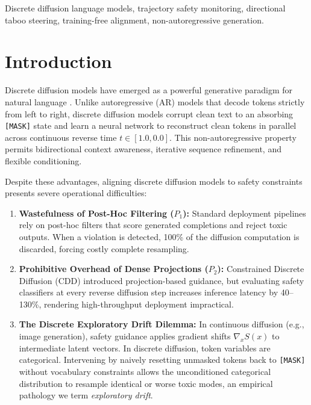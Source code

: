 \documentclass[conference]{IEEEtran}
\begin{document}
\begin{IEEEkeywords}
Discrete diffusion language models, trajectory safety monitoring, directional taboo steering, training-free alignment, non-autoregressive generation.
\end{IEEEkeywords}

\section{Introduction}
Discrete diffusion models have emerged as a powerful generative paradigm for natural language \cite{austin2021structured,sahoo2024simple}. Unlike autoregressive (AR) models that decode tokens strictly from left to right, discrete diffusion models corrupt clean text to an absorbing \texttt{[MASK]} state and learn a neural network to reconstruct clean tokens in parallel across continuous reverse time $t \in [1.0, 0.0]$. This non-autoregressive property permits bidirectional context awareness, iterative sequence refinement, and flexible conditioning.

Despite these advantages, aligning discrete diffusion models to safety constraints presents severe operational difficulties:
\begin{enumerate}
    \item \textbf{Wastefulness of Post-Hoc Filtering ($P_1$):} Standard deployment pipelines rely on post-hoc filters that score generated completions and reject toxic outputs. When a violation is detected, 100\% of the diffusion computation is discarded, forcing costly complete resampling.
    \item \textbf{Prohibitive Overhead of Dense Projections ($P_2$):} Constrained Discrete Diffusion (CDD) \cite{cardei2025cdd} introduced projection-based guidance, but evaluating safety classifiers at every reverse diffusion step increases inference latency by 40--130\%, rendering high-throughput deployment impractical.
    \item \textbf{The Discrete Exploratory Drift Dilemma:} In continuous diffusion (e.g., image generation), safety guidance applies gradient shifts $\nabla_x S(x)$ to intermediate latent vectors. In discrete diffusion, token variables are categorical. Intervening by naively resetting unmasked tokens back to \texttt{[MASK]} without vocabulary constraints allows the unconditioned categorical distribution to resample identical or worse toxic modes, an empirical pathology we term \textit{exploratory drift}.
\end{enumerate}
\end{document}
